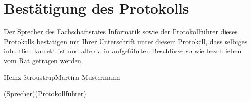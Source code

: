 \documentclass[a4paper, 11pt]{article} %
\newcommand{\abstimmung}[4]{
	\newcounter{summe}
	\setcounter{summe}{#3}
	\addtocounter{summe}{#4}
	\begin{flushleft}
		#1\\
	Es wird über den Antrag abgestimmt.
	\end{flushleft}
	\ifthenelse{\equal{#3}{0}\AND\equal{#4}{0}}{
	\begin{center}
		\textbf{Der Antrag wird einstimmig angenommen.}
	\end{center}
	}{
	\begin{center}
		#2 \ifthenelse{\equal{#2}{1}}{Stimme}{Stimmen} dafür, #3 \ifthenelse{\equal{#3}{1}}{Stimme}{Stimmen} dagegen, #4 \ifthenelse{\equal{#42}{1}}{Enthaltung}{Enthaltungen}\\
		\ifthenelse{#2>\value{summe}}{
		\textbf{Der Antrag ist somit angenommen.}
		}{
		\textbf{Der Antrag ist somit abgelehnt.}
		}
	\end{center}
	}  
}
\newcommand{\TeXer}{Martina Mustermann}
\newcommand{\fsiPresident}{Heinz Stroustrup}
\begin{document}

\pagebreak
\section{Bestätigung des Protokolls}
Der Sprecher des Fachschaftsrates Informatik sowie der Protokollführer dieses Protokolls bestätigen mit Ihrer Unterschrift unter diesem Protokoll, dass selbiges inhaltlich korrekt ist und alle darin aufgeführten Beschlüsse so wie beschrieben vom Rat getragen werden.
\\

\vspace{3.5cm}
\hrulefill \hfill \hrulefill

\fsiPresident \hfill \TeXer

{\footnotesize (Sprecher)\hfill (Protokollführer)}
\end{document}
